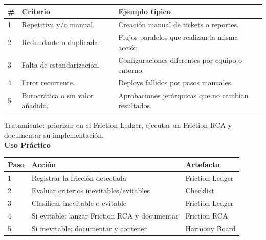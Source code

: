 \begin{center}
\begin{tabular}{|l|p{5cm}|p{6cm}|}
\hline
\# & Criterio & Ejemplo típico \\ \hline
1 & Repetitiva y/o manual. & Creación manual de tickets o reportes. \\ \hline
2 & Redundante o duplicada. & Flujos paralelos que realizan la misma acción. \\ \hline
3 & Falta de estandarización. & Configuraciones diferentes por equipo o entorno. \\ \hline
4 & Error recurrente. & Deploys fallidos por pasos manuales. \\ \hline
5 & Burocrática o sin valor añadido. & Aprobaciones jerárquicas que no cambian resultados. \\ \hline
\end{tabular}
\end{center}

Tratamiento: priorizar en el Friction Ledger, ejecutar un Friction RCA y documentar su implementación.\\

\textbf{Uso Práctico}

\begin{center}
\begin{tabular}{|l|p{6cm}|p{4cm}|}
\hline
Paso & Acción & Artefacto \\ \hline
1 & Registrar la fricción detectada & Friction Ledger \\ \hline
2 & Evaluar criterios inevitables/evitables & Checklist \\ \hline
3 & Clasificar inevitable o evitable & Friction Ledger \\ \hline
4 & Si evitable: lanzar Friction RCA y documentar & Friction RCA \\ \hline
5 & Si inevitable: documentar y contener & Harmony Board \\ \hline
\end{tabular}
\end{center}
